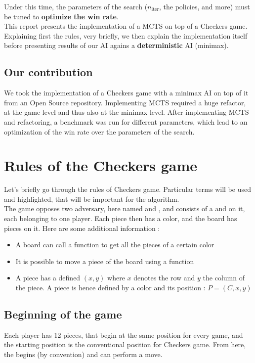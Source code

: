 \documentclass[11pt,a4paper]{article}
\begin{document}
Under this time, the parameters of the search ($n_{\text{iter}}$, the policies, and more) must be tuned to \textbf{optimize the win rate}. \\

This report presents the implementation of a MCTS on top of a Checkers game. Explaining first the rules, very briefly, we then explain the implementation itself before presenting results of our AI agains a \textbf{deterministic} AI (minimax).

\subsection{Our contribution}
We took the implementation of a Checkers game with a minimax AI on top of it from an Open Source repository. Implementing MCTS required a huge refactor, at the game level and thus also at the minimax level. After implementing MCTS and refactoring, a benchmark was run for different parameters, which lead to an optimization of the win rate over the parameters of the search. 
\section{Rules of the Checkers game}
Let's briefly go through the rules of Checkers game. Particular terms will be used and highlighted, that will be important for the algorithm. \\

The game opposes two adversary, here named  and , and consists of a  and  on it, each belonging to one player. Each piece then has a color, and the board has pieces on it. Here are some additional information :
\begin{itemize}[label=$\blacktriangleright$]
    \item A board can call a function to get all the pieces of a certain color 
    \item It is possible to move a piece of the board using a  function
    \item A piece has a defined  $(x,y)$ where $x$ denotes the row and $y$ the column of the piece. A piece is hence defined by a color and its position : $P = (C, x, y)$
\end{itemize}

\subsection{Beginning of the game}
Each player has 12 pieces, that begin at the same position for every game, and the starting position is the conventional position for Checkers game. From here, the  begins (by convention) and can perform a move.
\end{document}
